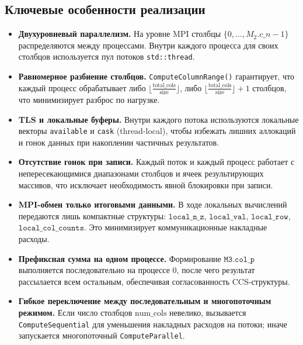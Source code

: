 \documentclass[12pt]{article}
\begin{document}
\subsection*{Ключевые особенности реализации}

\begin{itemize}
    \item \textbf{Двухуровневый параллелизм.}  
    На уровне MPI столбцы \(\{0,\dots,M_2.c\_n - 1\}\) распределяются между процессами. Внутри каждого процесса для своих столбцов используется пул потоков \texttt{std::thread}.

    \item \textbf{Равномерное разбиение столбцов.}  
    \texttt{ComputeColumnRange()} гарантирует, что каждый процесс обрабатывает либо \(\lfloor \tfrac{\text{total\_cols}}{\text{size}} \rfloor\), либо \(\lfloor \tfrac{\text{total\_cols}}{\text{size}} \rfloor + 1\) столбцов, что минимизирует разброс по нагрузке.

    \item \textbf{TLS и локальные буферы.}  
    Внутри каждого потока используются локальные векторы \texttt{available} и \texttt{cask} (thread-local), чтобы избежать лишних аллокаций и гонок данных при накоплении частичных результатов.

    \item \textbf{Отсутствие гонок при записи.}  
    Каждый поток и каждый процесс работает с непересекающимися диапазонами столбцов и ячеек результирующих массивов, что исключает необходимость явной блокировки при записи.

    \item \textbf{MPI-обмен только итоговыми данными.}  
    В ходе локальных вычислений передаются лишь компактные структуры: \(\texttt{local\_n\_z}\), \(\texttt{local\_val}\), \(\texttt{local\_row}\), \(\texttt{local\_col\_counts}\). Это минимизирует коммуникационные накладные расходы.

    \item \textbf{Префиксная сумма на одном процессе.}  
    Формирование \(\texttt{M3.col\_p}\) выполняется последовательно на процессе 0, после чего результат рассылается всем остальным, обеспечивая согласованность CCS-структуры.

    \item \textbf{Гибкое переключение между последовательным и многопоточным режимом.}  
    Если число столбцов \(\text{num\_cols}\) невелико, вызывается \texttt{ComputeSequential} для уменьшения накладных расходов на потоки; иначе запускается многопоточный \texttt{ComputeParallel}.
\end{itemize}
\end{document}
